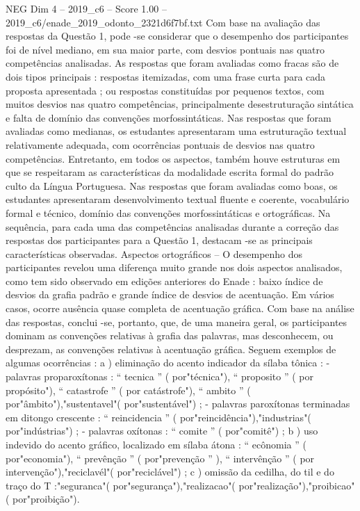 \begin{textsample}{NEG Dim 4 – 2019\_c6 – Score 1.00 – 2019\_c6/enade\_2019\_odonto\_2321d6f7bf.txt}
Com base na avaliação das respostas da Questão 1, pode -se considerar que o desempenho dos participantes foi de nível mediano, em sua maior parte, com desvios pontuais nas quatro competências analisadas.
As respostas que foram avaliadas como fracas são de dois tipos principais : respostas itemizadas, com uma frase curta para cada proposta apresentada ; ou respostas constituídas por pequenos textos, com muitos desvios nas quatro competências, principalmente desestruturação sintática e falta de domínio das convenções morfossintáticas.
Nas respostas que foram avaliadas como medianas, os estudantes apresentaram uma estruturação textual relativamente adequada, com ocorrências pontuais de desvios nas quatro competências.
Entretanto, em todos os aspectos, também houve estruturas em que se respeitaram as características da modalidade escrita formal do padrão culto da Língua Portuguesa.
Nas respostas que foram avaliadas como boas, os estudantes apresentaram desenvolvimento textual fluente e coerente, vocabulário formal e técnico, domínio das convenções morfossintáticas e ortográficas.
Na sequência, para cada uma das competências analisadas durante a correção das respostas dos participantes para a Questão 1, destacam -se as principais características observadas.
Aspectos ortográficos – O desempenho dos participantes revelou uma diferença muito grande nos dois aspectos analisados, como tem sido observado em edições anteriores do Enade : baixo índice de desvios da grafia padrão e grande índice de desvios de acentuação.
Em vários casos, ocorre ausência quase completa de acentuação gráfica.
Com base na análise das respostas, conclui -se, portanto, que, de uma maneira geral, os participantes dominam as convenções relativas à grafia das palavras, mas desconhecem, ou desprezam, as convenções relativas à acentuação gráfica.
Seguem exemplos de algumas ocorrências : a ) eliminação do acento indicador da sílaba tônica : - palavras proparoxítonas : “ tecnica ” ( por"técnica"), “ proposito ” ( por propósito"), “ catastrofe ” ( por catástrofe"), “ ambito ” ( por"âmbito"),"sustentavel"( por"sustentável") ; - palavras paroxítonas terminadas em ditongo crescente : “ reincidencia ” ( por"reincidência"),"industrias"( por"indústrias") ; - palavras oxítonas : “ comite ” ( por"comitê") ; b ) uso indevido do acento gráfico, localizado em sílaba átona : “ ecônomia ” ( por"economia"), “ prevênção ” ( por"prevenção ” ), “ intervênção ” ( por intervenção"),"reciclavél"( por"reciclável") ; c ) omissão da cedilha, do til e do traço do T :"seguranca"( por"segurança"),"realizacao"( por"realização"),"proibicao"( por"proibição").

\end{textsample}
